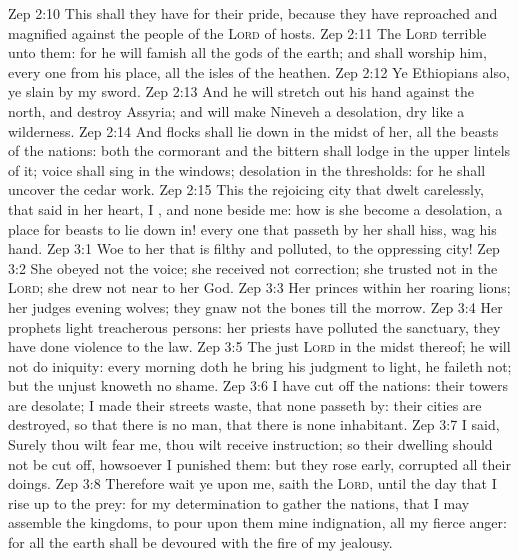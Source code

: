 \vs Zep 2:10 This shall they have for their pride, because they have reproached and magnified  against the people of the \textsc{Lord} of hosts.
\vs Zep 2:11 The \textsc{Lord}  terrible unto them: for he will famish all the gods of the earth; and  shall worship him, every one from his place,  all the isles of the heathen.
\vs Zep 2:12 Ye Ethiopians also, ye  slain by my sword.
\vs Zep 2:13 And he will stretch out his hand against the north, and destroy Assyria; and will make Nineveh a desolation,  dry like a wilderness.
\vs Zep 2:14 And flocks shall lie down in the midst of her, all the beasts of the nations: both the cormorant and the bittern shall lodge in the upper lintels of it;  voice shall sing in the windows; desolation  in the thresholds: for he shall uncover the cedar work.
\vs Zep 2:15 This  the rejoicing city that dwelt carelessly, that said in her heart, I , and  none beside me: how is she become a desolation, a place for beasts to lie down in! every one that passeth by her shall hiss,  wag his hand.
\vs Zep 3:1 Woe to her that is filthy and polluted, to the oppressing city!
\vs Zep 3:2 She obeyed not the voice; she received not correction; she trusted not in the \textsc{Lord}; she drew not near to her God.
\vs Zep 3:3 Her princes within her  roaring lions; her judges  evening wolves; they gnaw not the bones till the morrow.
\vs Zep 3:4 Her prophets  light  treacherous persons: her priests have polluted the sanctuary, they have done violence to the law.
\vs Zep 3:5 The just \textsc{Lord}  in the midst thereof; he will not do iniquity: every morning doth he bring his judgment to light, he faileth not; but the unjust knoweth no shame.
\vs Zep 3:6 I have cut off the nations: their towers are desolate; I made their streets waste, that none passeth by: their cities are destroyed, so that there is no man, that there is none inhabitant.
\vs Zep 3:7 I said, Surely thou wilt fear me, thou wilt receive instruction; so their dwelling should not be cut off, howsoever I punished them: but they rose early,  corrupted all their doings.
\vs Zep 3:8 Therefore wait ye upon me, saith the \textsc{Lord}, until the day that I rise up to the prey: for my determination  to gather the nations, that I may assemble the kingdoms, to pour upon them mine indignation,  all my fierce anger: for all the earth shall be devoured with the fire of my jealousy.
